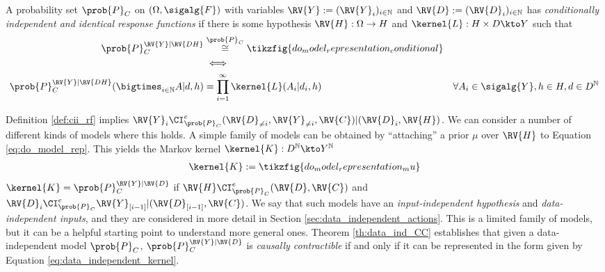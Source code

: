 \begin{definition}\label{def:cii_rf}
A probability set $\prob{P}_C$ on $(\Omega,\sigalg{F})$ with variables $\RV{Y}:=(\RV{Y}_i)_{i\in \mathbb{N}}$ and $\RV{D}:=(\RV{D}_i)_{i\in\mathbb{N}}$ has \emph{conditionally independent and identical response functions} if there is some hypothesis $\RV{H}:\Omega\to H$ and $\kernel{L}:H\times D\kto Y$ such that
\begin{align}
    \prob{P}_C^{\RV{Y}|\RV{DH}} &\overset{\prob{P}_C}{\cong} \tikzfig{do_model_representation_conditional}\label{eq:do_model_rep}\\
    &\iff\\
    \prob{P}_C^{\RV{Y}|\RV{DH}}(\bigtimes_{i\in\mathbb{N}} A|d,h) &= \prod_{i=1}^{\infty} \kernel{L}(A_i{}|d_i,h)&\forall A_i\in\sigalg{Y},h\in H,d\in D^{\mathbb{N}}
\end{align}
\end{definition}

Definition \ref{def:cii_rf} implies $\RV{Y}_i\CI_{\prob{P}_C}^e (\RV{D}_{\neq i},\RV{Y}_{\neq i},\RV{C})|(\RV{D}_i,\RV{H})$. We can consider a number of different kinds of models where this holds. A simple family of models can be obtained by ``attaching'' a prior $\mu$ over $\RV{H}$ to Equation \ref{eq:do_model_rep}. This yields the Markov kernel $\kernel{K}:D^{\mathbb{N}}\kto Y^{\mathbb{N}}$
\begin{align}
    \kernel{K} := \tikzfig{do_model_representation_mu}\label{eq:data_independent_kernel}
\end{align}
$\kernel{K}=\prob{P}_C^{\RV{Y}|\RV{D}}$ if $\RV{H}\CI^e_{\prob{P}_C} (\RV{D},\RV{C})$ and $\RV{D}_i \CI^e_{\prob{P}_C} \RV{Y}_{[i-1]}|(\RV{D}_{[i-1]},\RV{C})$. We say that such models have an \emph{input-independent hypothesis} and \emph{data-independent inputs}, and they are considered in more detail in Section \ref{sec:data_independent_actions}. This is a limited family of models, but it can be a helpful starting point to understand more general ones. Theorem \ref{th:data_ind_CC} establishes that given a data-independent model $\prob{P}_C$, $\prob{P}_C^{\RV{Y}|\RV{D}}$ is \emph{causally contractible} if and only if it can be represented in the form given by Equation \ref{eq:data_independent_kernel}. 

